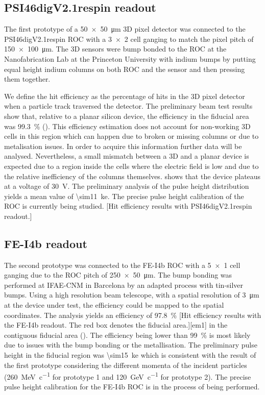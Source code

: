 \subsection{PSI46digV2.1respin readout}
The first prototype of a \SI{50x50}{\micro\meter} 3D pixel detector was connected to the PSI46digV2.1respin \ac{ROC} \cite{kornmayer} with a \SI{3x2}{} cell ganging to match the pixel pitch of \SI{150x100}{\micro\meter}. The 3D sensors were bump bonded to the \ac{ROC} at the Nanofabrication Lab at the Princeton University with indium bumps by putting equal height indium columns on both \ac{ROC} and the sensor and then pressing them together.\par
We define the hit efficiency as the percentage of hits in the 3D pixel detector when a particle track traversed the detector. The preliminary beam test results show that, relative to a planar silicon device, the efficiency in the fiducial area was \SI{99.3}{\%} (). This efficiency estimation does not account for non-working 3D cells in this region which can happen due to broken or missing columns or due to metalisation issues. In order to acquire this information further data will be analysed. Nevertheless, a small mismatch between a 3D and a planar device is expected due to a region inside the cells where the electric field is low \cite{guilio} and due to the relative inefficiency of the columns themselves.  shows that the device plateaus at a voltage of \SI{30}{\volt}. The preliminary analysis of the pulse height distribution yields a mean value of \SI{\sim11}{\kilo e}. The precise pulse height calibration of the \ac{ROC} is currently being studied.
[Hit efficiency results with PSI46digV2.1respin readout.]
\subsection{FE-I4b readout}
The second prototype was connected to the FE-I4b \ac{ROC} \cite{fei4} with a \SI{5x1}{} cell ganging due to the \ac{ROC} pitch of \SI{250x50}{\micro\meter}. The bump bonding was performed at IFAE-CNM in Barcelona by an adapted process with tin-silver bumps. Using a high resolution beam telescope,  with a spatial resolution of \SI{3}{\micro\meter} at the device under test, the efficiency could be mapped to the spatial coordinates. The analysis yields an efficiency of \SI{97.8}{\%} 
\vspace*{-10pt}[Hit efficiency results with the FE-I4b readout. The red box denotes the fiducial area.][em1]
in the contiguous fiducial area (). The efficiency being lower than \SI{99}{\%} is most likely due to issues with the bump bonding or the metallisation. The preliminary pulse height in the fiducial region was \SI{\sim15}{\kilo e} which is consistent with the result of the first prototype considering the different momenta of the incident particles (\SI{260}{\mega\electronvolt\per c} for prototype 1 and \SI{120}{\giga\electronvolt\per c} for prototype 2). The precise pulse height calibration for the FE-I4b \ac{ROC} is in the process of being performed.
